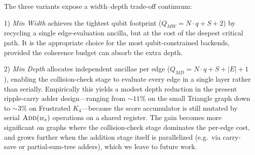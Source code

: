 \documentclass{ieeeaccess}
\begin{document}
\begin{table}[htbp]
\caption{Empirical Space-Time Compilation (Single Grover Iteration)}
\label{tab:results_n}
\centering
{}
\end{table}

The three variants expose a width--depth trade-off continuum:

1) \emph{Min Width} achieves the tightest qubit footprint ($Q_{MW} = N \cdot q + S + 2$) by recycling a single edge-evaluation ancilla, but at the cost of the deepest critical path. It is the appropriate choice for the most qubit-constrained backends, provided the coherence budget can absorb the extra depth.

2) \emph{Min Depth} allocates independent ancillae per edge ($Q_{MD} = N \cdot q + S + |E| + 1$), enabling the collision-check stage to evaluate every edge in a single layer rather than serially. Empirically this yields a modest depth reduction in the present ripple-carry adder design---ranging from $\sim 11\%$ on the small Triangle graph down to $\sim 3\%$ on Frustrated $K_4$---because the score accumulator is still mutated by serial $\textsc{Add}(w_e)$ operations on a shared register. The gain becomes more significant on graphs where the collision-check stage dominates the per-edge cost, and grows further when the addition stage itself is parallelized (e.g.\ via carry-save or partial-sum-tree adders), which we leave to future work.
\end{document}
